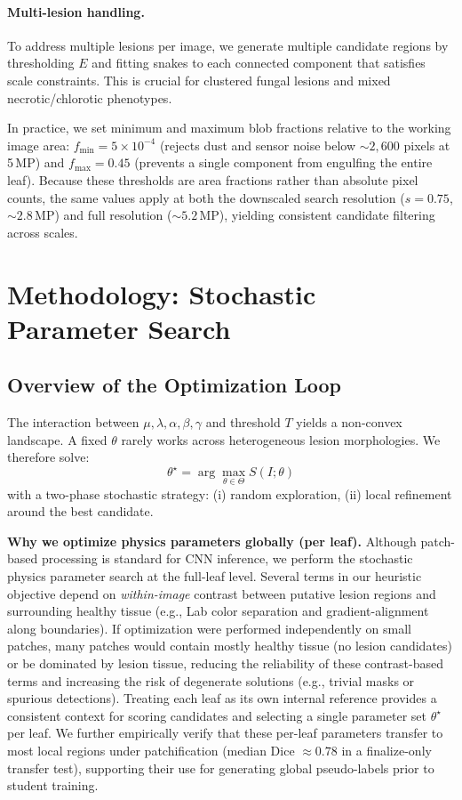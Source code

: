 \documentclass[11pt,a4paper]{article}
\begin{document}
\paragraph{Multi-lesion handling.}
To address multiple lesions per image, we generate multiple candidate regions by thresholding $E$ and fitting snakes to each connected component that satisfies scale constraints. This is crucial for clustered fungal lesions and mixed necrotic/chlorotic phenotypes.

In practice, we set minimum and maximum blob fractions relative to the working image area: $f_{\min}=5\times10^{-4}$ (rejects dust and sensor noise below ${\sim}2{,}600$ pixels at 5\,MP) and $f_{\max}=0.45$ (prevents a single component from engulfing the entire leaf). Because these thresholds are area fractions rather than absolute pixel counts, the same values apply at both the downscaled search resolution ($s{=}0.75$, ${\sim}2.8$\,MP) and full resolution (${\sim}5.2$\,MP), yielding consistent candidate filtering across scales.

\section{Methodology: Stochastic Parameter Search}

\subsection{Overview of the Optimization Loop}
The interaction between $\mu,\lambda,\alpha,\beta,\gamma$ and threshold $T$ yields a non-convex landscape. A fixed $\theta$ rarely works across heterogeneous lesion morphologies. We therefore solve:
\begin{equation}
\theta^\star = \arg\max_{\theta\in\Theta} S(I;\theta)
\end{equation}
with a two-phase stochastic strategy: (i) random exploration, (ii) local refinement around the best candidate.

\textbf{Why we optimize physics parameters globally (per leaf).}
Although patch-based processing is standard for CNN inference, we perform the stochastic physics parameter search at the full-leaf level. Several terms in our heuristic objective depend on \emph{within-image} contrast between putative lesion regions and surrounding healthy tissue (e.g., Lab color separation and gradient-alignment along boundaries). If optimization were performed independently on small patches, many patches would contain mostly healthy tissue (no lesion candidates) or be dominated by lesion tissue, reducing the reliability of these contrast-based terms and increasing the risk of degenerate solutions (e.g., trivial masks or spurious detections). Treating each leaf as its own internal reference provides a consistent context for scoring candidates and selecting a single parameter set $\theta^\star$ per leaf. We further empirically verify that these per-leaf parameters transfer to most local regions under patchification (median Dice $\approx 0.78$ in a finalize-only transfer test), supporting their use for generating global pseudo-labels prior to student training.
\end{document}
